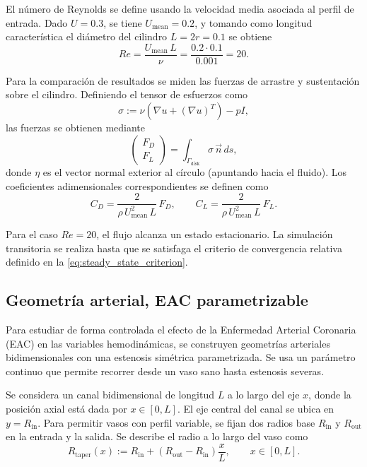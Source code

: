 \documentclass[12pt, letterpaper]{article}
\begin{document}
El número de Reynolds se define usando la velocidad media asociada al perfil de entrada. Dado $U=0.3$, se tiene $U_{\mathrm{mean}}=0.2$, y tomando como longitud característica el diámetro del cilindro $L=2r=0.1$ se obtiene
\begin{equation}
  \label{eq:dfg1_re}
  Re = \frac{U_{\mathrm{mean}}\,L}{\nu} = \frac{0.2\cdot 0.1}{0.001}=20.
\end{equation}

Para la comparación de resultados se miden las fuerzas de arrastre y sustentación sobre el cilindro. Definiendo el tensor de esfuerzos como
\begin{equation}
  \label{eq:dfg1_stress}
  \sigma := \nu\left(\nabla u + (\nabla u)^T\right) - pI,
\end{equation}
\noindent las fuerzas se obtienen mediante
\begin{equation}
  \label{eq:dfg1_forces}
  \begin{pmatrix}F_D\\F_L
  \end{pmatrix}
  =\int_{\Gamma_{\mathrm{disk}}}\sigma\,\vec{n}\,ds,
\end{equation}
\noindent donde $\eta$ es el vector normal exterior al círculo (apuntando hacia el fluido). Los coeficientes adimensionales correspondientes se definen como
\begin{equation}
  \label{eq:dfg1_coeffs}
  C_D = \frac{2}{\rho\, U_{\mathrm{mean}}^2\,L}\,F_D,
  \qquad
  C_L = \frac{2}{\rho\, U_{\mathrm{mean}}^2\,L}\,F_L.
\end{equation}

Para el caso $Re=20$, el flujo alcanza un estado estacionario. La simulación transitoria se realiza hasta que se satisfaga el criterio de convergencia relativa definido en la \cref{eq:steady_state_criterion}.

\subsection{Geometría arterial, EAC parametrizable} \label{sec:geom_arterial}

Para estudiar de forma controlada el efecto de la Enfermedad Arterial Coronaria (EAC) en las variables hemodinámicas, se construyen geometrías arteriales bidimensionales con una estenosis simétrica parametrizada. Se usa un parámetro continuo que permite recorrer desde un vaso sano hasta estenosis severas.

Se considera un canal bidimensional de longitud $L$ a lo largo del eje $x$, donde la posición axial está dada por $x \in [0, L]$. El eje central del canal se ubica en $y = R_{\mathrm{in}}$. Para permitir vasos con perfil variable, se fijan dos radios base $R_{\mathrm{in}}$ y $R_{\mathrm{out}}$ en la entrada y la salida. Se describe el radio a lo largo del vaso como
\begin{equation}
  \label{eq:eac_linear_taper}
  R_{\mathrm{taper}}(x)
  := R_{\mathrm{in}} + \left(R_{\mathrm{out}}-R_{\mathrm{in}}\right)\frac{x}{L},
  \qquad x\in[0,L].
\end{equation}
\end{document}
